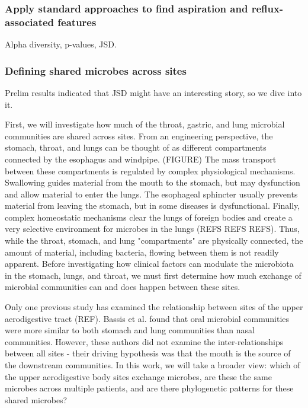 \documentclass[12pt]{article}
\begin{document}
\subsubsection{Apply standard approaches to find aspiration and reflux-associated features}
Alpha diversity, p-values, JSD.

\subsubsection{Defining shared microbes across sites}
Prelim results indicated that JSD might have an interesting story, so we dive into it.

First, we will investigate how much of the throat, gastric, and lung microbial communities are shared across sites. From an engineering perspective, the stomach, throat, and lungs can be thought of as different compartments connected by the esophagus and windpipe. (FIGURE) The mass transport between these compartments is regulated by complex physiological mechanisms. Swallowing guides material from the mouth to the stomach, but may dysfunction and allow material to enter the lungs. The esophageal sphincter usually prevents material from leaving the stomach, but in some diseases is dysfunctional. Finally, complex homeostatic mechanisms clear the lungs of foreign bodies and create a very selective environment for microbes in the lungs (REFS REFS REFS). Thus, while the throat, stomach, and lung "compartments" are physically connected, the amount of material, including bacteria, flowing between them is not readily apparent. Before investigating how clinical factors can modulate the microbiota in the stomach, lungs, and throat, we must first determine how much exchange of microbial communities can and does happen between these sites.

Only one previous study has examined the relationship between sites of the upper aerodigestive tract (REF). Bassis et al. found that oral microbial communities were more similar to both stomach and lung communities than nasal communities. However, these authors did not examine the inter-relationships between all sites - their driving hypothesis was that the mouth is the source of the downstream communities. In this work, we will take a broader view: which of the upper aerodigestive body sites exchange microbes, are these the same microbes across multiple patients, and are there phylogenetic patterns for these shared microbes? 
\end{document}
